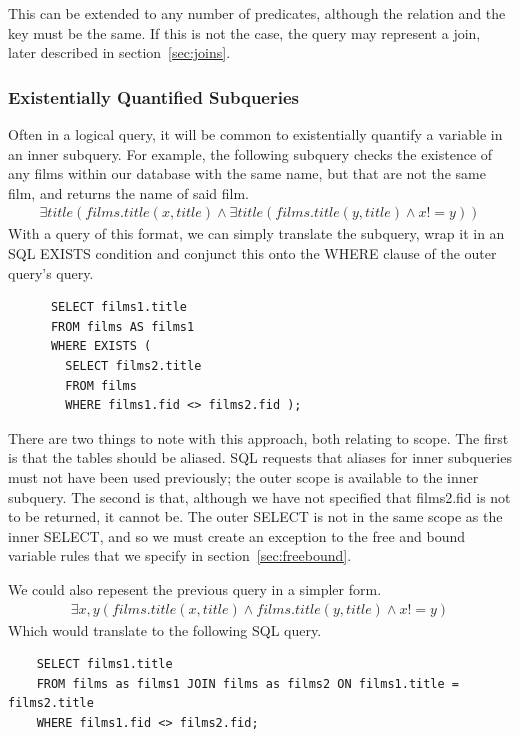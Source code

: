 \documentclass[a4paper, 11pt]{article}
\begin{document}
    This can be extended to any number of predicates, although the relation and
    the key must be the same. If this is not the case, the query may represent
    a join, later described in section~\ref{sec:joins}.

    \subsubsection{Existentially Quantified Subqueries}
    \label{sec:existential}
    Often in a logical query, it will be common to existentially quantify a
    variable in an inner subquery. For example, the following subquery checks
    the existence of any films within our database with the same name, but that
    are not the same film, and returns the name of said film.
    \begin{multline}
      \exists title(films.title(x, title) \land \exists title(films.title(y,
      title) \land x != y))
    \end{multline}
    With a query of this format, we can simply translate the subquery, wrap it
    in an SQL EXISTS condition and conjunct this onto the WHERE clause of the
    outer query's query.

    \begin{verbatim}
      SELECT films1.title
      FROM films AS films1
      WHERE EXISTS (
        SELECT films2.title
        FROM films
        WHERE films1.fid <> films2.fid );
    \end{verbatim}

    There are two things to note with this approach, both relating to scope.
    The first is that the tables should be aliased. SQL requests that aliases
    for inner subqueries must not have been used previously; the outer scope is
    available to the inner subquery. The second is that, although we have not
    specified that films2.fid is not to be returned, it cannot be. The outer
    SELECT is not in the same scope as the inner SELECT, and so we must create
    an exception to the free and bound variable rules that we specify in
    section~\ref{sec:freebound}.

    We could also repesent the previous query in a simpler form.
    \begin{multline}
      \exists x,y(films.title(x, title) \land films.title(y, title)
        \land x != y)
    \end{multline}
    Which would translate to the following SQL query.

    \begin{verbatim}
    SELECT films1.title
    FROM films as films1 JOIN films as films2 ON films1.title = films2.title
    WHERE films1.fid <> films2.fid;
    \end{verbatim}
\end{document}
